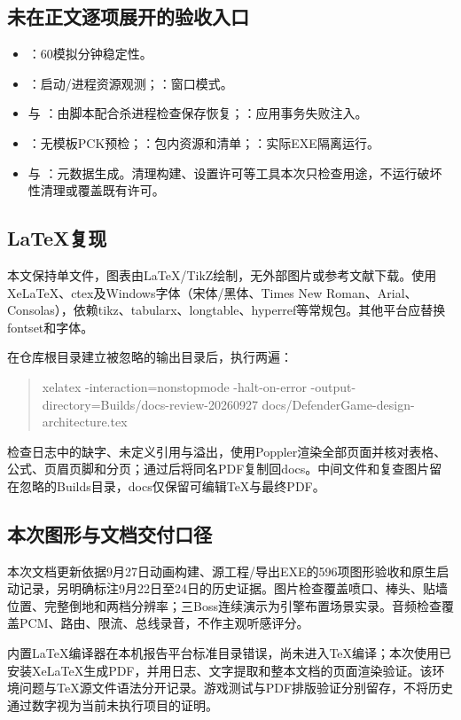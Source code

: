 \documentclass[UTF8,a4paper,11pt,fontset=windows]{ctexart}
\begin{document}
\subsection{未在正文逐项展开的验收入口}
\begin{itemize}
\item {}：60模拟分钟稳定性。
\item {}：启动/进程资源观测；：窗口模式。
\item {} 与 ：由脚本配合杀进程检查保存恢复；：应用事务失败注入。
\item {}：无模板PCK预检；：包内资源和清单；：实际EXE隔离运行。
\item {} 与 ：元数据生成。清理构建、设置许可等工具本次只检查用途，不运行破坏性清理或覆盖既有许可。
\end{itemize}


\subsection{LaTeX复现}
本文保持单文件，图表由LaTeX/TikZ绘制，无外部图片或参考文献下载。使用XeLaTeX、ctex及Windows字体（宋体/黑体、Times New Roman、Arial、Consolas），依赖tikz、tabularx、longtable、hyperref等常规包。其他平台应替换fontset和字体。

在仓库根目录建立被忽略的输出目录后，执行两遍：
\begin{quote}\small\ttfamily
xelatex -interaction=nonstopmode -halt-on-error\newline
\hspace*{1em}-output-directory=Builds/docs-review-20260927\newline
\hspace*{1em}docs/DefenderGame-design-architecture.tex
\end{quote}
检查日志中的缺字、未定义引用与溢出，使用Poppler渲染全部页面并核对表格、公式、页眉页脚和分页；通过后将同名PDF复制回docs。中间文件和复查图片留在忽略的Builds目录，docs仅保留可编辑TeX与最终PDF。

\subsection{本次图形与文档交付口径}
\label{sec:finalqa}
本次文档更新依据9月27日动画构建、源工程/导出EXE的596项图形验收和原生启动记录，另明确标注9月22日至24日的历史证据。图片检查覆盖喷口、棒头、贴墙位置、完整倒地和两档分辨率；三Boss连续演示为引擎布置场景实录。音频检查覆盖PCM、路由、限流、总线录音，不作主观听感评分。

内置LaTeX编译器在本机报告平台标准目录错误，尚未进入TeX编译；本次使用已安装XeLaTeX生成PDF，并用日志、文字提取和整本文档的页面渲染验证。该环境问题与TeX源文件语法分开记录。游戏测试与PDF排版验证分别留存，不将历史通过数字视为当前未执行项目的证明。
\end{document}
